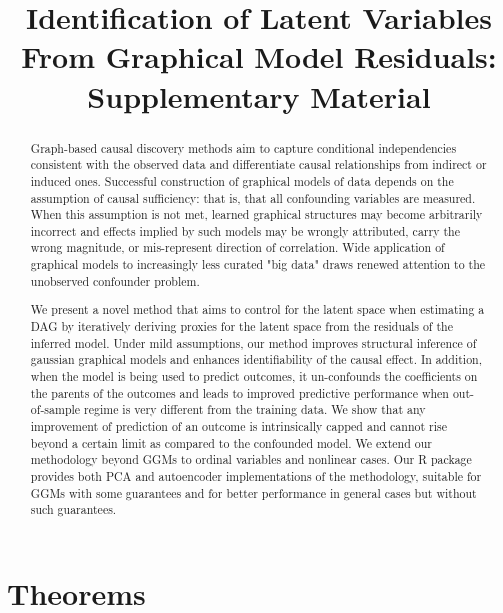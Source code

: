 \documentclass[letterpaper]{article}
\title{Identification of Latent Variables From Graphical Model Residuals: Supplementary Material}
\begin{document}
\maketitle

\begin{abstract}
Graph-based causal discovery methods aim to capture conditional independencies consistent with the observed data and differentiate causal relationships from indirect or induced ones.  Successful construction of graphical models of data depends on the assumption of causal sufficiency: that is, that all confounding variables are measured. When this assumption is not met, learned graphical structures may become arbitrarily incorrect and effects implied by such models may be wrongly attributed, carry the wrong magnitude, or mis-represent direction of correlation.  Wide application of graphical models to increasingly less curated "big data" draws renewed attention to the unobserved confounder problem.  

We present a novel method that aims to control for the latent space when estimating a DAG by iteratively deriving proxies for the latent space from the residuals of the inferred model.  Under mild assumptions, our method improves structural inference of gaussian graphical models and enhances identifiability of the causal effect. In addition, when the model is being used to predict outcomes, it un-confounds the coefficients on the parents of the outcomes and leads to improved predictive performance when out-of-sample regime is very different from the training data.  We show that any improvement of prediction of an outcome is intrinsically capped and cannot rise beyond a certain limit as compared to the confounded model.  We extend our methodology beyond GGMs to ordinal variables and nonlinear cases.  Our R package provides both PCA and autoencoder implementations of the methodology, suitable for GGMs with some guarantees and for better performance in general cases but without such guarantees. 
\end{abstract}

\section{Theorems}
\end{document}
